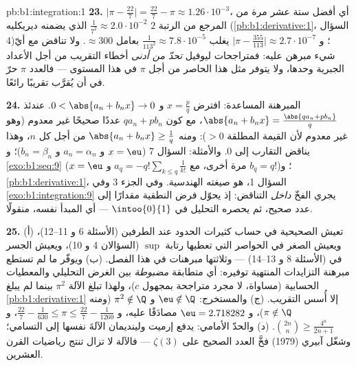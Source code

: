 \begin{solution}{pb:b1:integration:1}
\textbf{23.} $\bigl|\pi - \frac{22}{7}\bigr| = \frac{22}{7} -
\pi \approx 1.26\cdot10^{-3}$، أي أفضل ستة عشر مرة من
المرجع من الرتبة $2$ $\frac{1}{7^2} \approx 2.0\cdot10^{-2}$
الذي يضمنه ديريكليه (\cref{pb:b1:derivative:1}، السؤال 4)؛
و $\bigl|\pi - \frac{355}{113}\bigr| \approx 2.7\cdot10^{-7}$
يغلب $\frac{1}{113^2} \approx 7.8\cdot10^{-5}$ بعامل
$\approx 300$. ولا تناقض مع أيّ شيء مبرهن عليه: فمتراجحات
ليوفيل \emph{تحدّ من أدنى} أخطاء التقريب من أجل
الأعداد الجبرية وحدها، ولا يتوفر مثل هذا الحاصر من أجل $\pi$ في
هذا المستوى --- فالعدد $\pi$ حرّ في أن يُقرَّب تقريبًا رائعًا.

\textbf{24.} المبرهنة المساعدة: افترض $x = \frac pq$ و $0 < \abs{a_n +
b_n x} \to 0$. عندئذ $\abs{a_n + b_n x} = \frac{\abs{q a_n + p
b_n}}{q}$، مع كون $q a_n + p b_n$ عددًا صحيحًا غير معدوم (وهو غير معدوم
لأن القيمة المطلقة $> 0$): ومنه $\abs{a_n + b_n x}
\geq \frac1q$ من أجل كل $n$، وهذا يناقض التقارب إلى
$0$. والأمثلة: السؤال 7 ($x = \eu$ و $a_n = \alpha_n$ و $b_n =
\beta_n$)؛ و \cref{exo:b1:seq:9} ($x = \eu$ مرة أخرى، مع $a_q =
-q!\sum_{k \leq q}\frac{1}{k!}$ و $b_q = q!$)؛ و
\cref{pb:b1:derivative:1}، السؤال 1، هو صيغته الهندسية.
وفي الجزء 3 وفي \cref{exo:b1:integration:9} يجري الفخّ
\emph{داخل} التناقض: إذ يحوّل فرض النطقية
مقدارًا إلى عدد صحيح، ثم يحصره التحليل
في $\intoo{0}{1}$ --- أي المبدأ نفسه، منقولًا.

\textbf{25.} (أ) تعيش الصحيحية في حساب كثيرات الحدود
عند الطرفين (الأسئلة 6 و 11--12)، ويعيش الصغر في الحواصر
التي تعطيها رتابة $\sup$ (السؤالان 4 و 10)، ويعيش الجسر في
 (الأسئلة 8 و 13--14) --- وثلاثتها
مبرهنات في هذا الفصل. (ب) ويوفّر  ما لم تستطع
مبرهنة التزايدات المنتهية توفيره: أي متطابقة \emph{مضبوطة} بين
الغرض التحليلي والمعطيات الحسابية (مساواة، لا مجرد
متراجحة بمجهول $c$)، ولهذا تبلغ الآلة
$\pi^2$ بينما لم يبلغ \cref{pb:b1:derivative:1} إلا
أُسس التقريب. (ج) والمستخرج: $\eu \notin \Q$ و
$\pi^2 \notin \Q$ (ومنه $\pi \notin \Q$)، و $\eu = 2.718282$
مصادَقًا عليه، و $\frac{22}{7} - \frac{1}{630} \leq \pi \leq
\frac{22}{7} - \frac{1}{1260}$، و $\binom{2n}{n} \geq
\frac{4^n}{2n+1}$. (د) والحدّ الأمامي: يدفع إرميت ولينديمان
الآلةَ نفسها إلى التسامي؛ وشغّل آبيري (1979)
فخَّ العدد الصحيح على $\zeta(3)$ --- فالآلة لا تزال تنتج
رياضيات القرن العشرين.
\end{solution}
